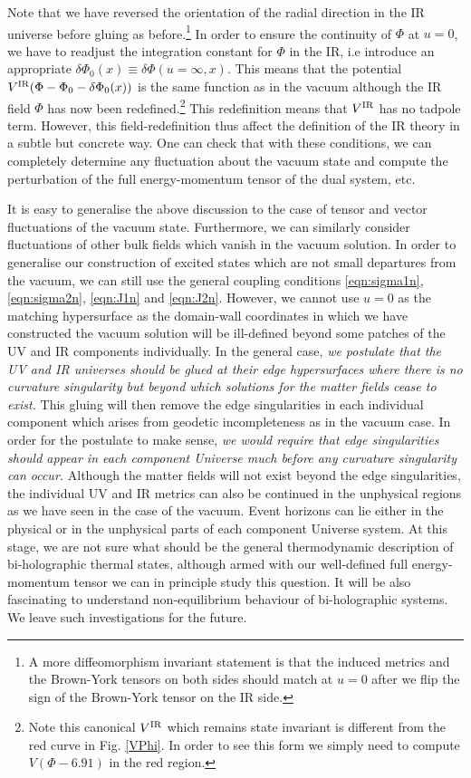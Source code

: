 \documentclass[prd,reprint,a4paper,showpacs,superscriptaddress,11pt,onecolumn,nofootinbib]{revtex4-1}
\renewcommand{\(}{\left(}
\renewcommand{\)}{\right)}
\newcommand{\6}{\partial}
\begin{document}
Note that we have reversed the orientation of the radial direction in the IR universe before gluing as before.\footnote{A more diffeomorphism invariant statement is that the induced metrics and the Brown-York tensors on both sides should match at $u=0$ after we flip the sign of the Brown-York tensor on the IR side.} In order to ensure the continuity of $\Phi$ at $u=0$, we have to readjust the integration constant for $\Phi$ in the IR, i.e introduce an appropriate $\delta \Phi_0(x) \equiv \delta \Phi(u = \infty, x)$. This means that the potential $V^{\rm IR}(\Phi - \Phi_0 - \delta \Phi_0(x))$ is the same function as in the vacuum although the IR field $\Phi$ has now been redefined.\footnote{Note this canonical $V^{\rm IR}$ which remains state invariant is different from the red curve in Fig. \ref{VPhi}. In order to see this form we simply need to compute $V(\Phi -6.91)$ in the red region.} This redefinition means that $V^{\rm IR}$ has no tadpole term. However, this field-redefinition thus affect the definition of the IR theory in a subtle but concrete way. One can check that with these conditions, we can completely determine any fluctuation about the vacuum state and compute the perturbation of the full energy-momentum tensor of the dual system, etc.

It is easy to generalise the above discussion to the case of tensor and vector fluctuations of the vacuum state. Furthermore, we can similarly consider fluctuations of other bulk fields which vanish in the vacuum solution. In order to generalise our construction of  excited states which are not small departures from the vacuum, we can still use the general coupling conditions \eqref{eqn:sigma1n},  \eqref{eqn:sigma2n},  \eqref{eqn:J1n} and  \eqref{eqn:J2n}. However, we cannot use $u=0$ as the matching hypersurface as the domain-wall coordinates in which we have constructed the vacuum solution will be ill-defined beyond some patches of the UV and IR components individually. In the general case, \textit{we postulate that the UV and IR universes should be glued at their edge hypersurfaces where there is no curvature singularity but beyond which solutions for the matter fields cease to exist.} This gluing will then remove the edge singularities in each individual component which arises from geodetic incompleteness as in the vacuum case. In order for the postulate to make sense, \textit{we would require that edge singularities should appear in each component Universe much before any curvature singularity can occur.} Although the matter fields will not exist beyond the edge singularities, the individual UV and IR metrics can also be continued in the unphysical regions as we have seen in the case of the vacuum. Event horizons can lie either in the physical or in the unphysical parts of each component Universe system. At this stage, we are not sure what should be the general thermodynamic description of bi-holographic thermal states, although armed with our well-defined full energy-momentum tensor we can in principle study this question. It will be also fascinating to understand non-equilibrium behaviour of bi-holographic systems. We leave such investigations for the future.
\end{document}
